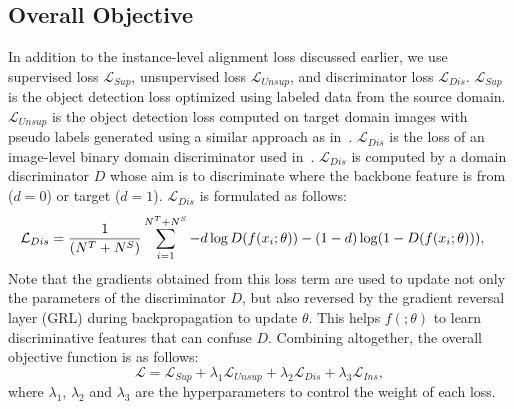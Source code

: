 \documentclass{bmvc2k}
\begin{document}
\subsection{Overall Objective}\label{sec:overall loss}
In addition to the instance-level alignment loss discussed earlier, we use supervised loss $\mathcal{L}_{Sup}$, unsupervised loss $\mathcal{L}_{Unsup}$, and discriminator loss $\mathcal{L}_{Dis}$.
$\mathcal{L}_{Sup}$ is the object detection loss optimized using labeled data from the source domain.
$\mathcal{L}_{Unsup}$ 
is the object detection loss computed on target domain images with pseudo labels generated using a similar approach as in~\cite{li2022cross}.
$\mathcal{L}_{Dis}$ is the loss of an image-level binary domain discriminator used in~\cite{he2019multi, xie2019multi}.
$\mathcal{L}_{Dis}$ is computed by a domain discriminator $D$ whose aim is to discriminate where the backbone feature is from ($d = 0$) or target ($d = 1$). 
$\mathcal{L}_{Dis}$ is formulated as follows:
\begin{align*}
  \MoveEqLeft[5] \mathcal{L}_{Dis} = \frac{1}{(N^T+N^S)} \sum_{i=1}^{N^T+N^S}- d\log D(f(x_{i}; \theta))-(1-d)\log(1-D(f(x_{i}; \theta))),
\end{align*}
Note that the gradients obtained from this loss term are used to update not only the parameters of the discriminator $D$, but also reversed by the gradient reversal layer (GRL) during backpropagation to update $\theta$. This helps $f(;\theta)$ to learn discriminative features that can confuse $D$.
Combining altogether, the overall objective function is as follows:
\begin{equation}
\mathcal{L}=\mathcal{L}_{Sup} + \lambda_1 \mathcal{L}_{Unsup}+ \lambda_2 \mathcal{L}_{Dis} + \lambda_3 \mathcal{L}_{Ins},
\label{eq:overall_loss}
\end{equation}
where $\lambda_1$, $\lambda_2$ and $\lambda_3$ are the hyperparameters to control the weight of each loss.
\end{document}
